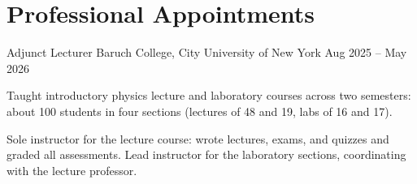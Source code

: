 \section{Professional Appointments}

\begin{workexperience}
  {Adjunct Lecturer}
  {Baruch College, City University of New York}
  {Aug 2025 -- May 2026}

  \item Taught introductory physics lecture and laboratory courses across two
  semesters: about 100 students in four sections (lectures of 48 and 19,
  labs of 16 and 17).

  \item Sole instructor for the lecture course: wrote lectures, exams, and
  quizzes and graded all assessments. Lead instructor for the laboratory
  sections, coordinating with the lecture professor.
\end{workexperience}
